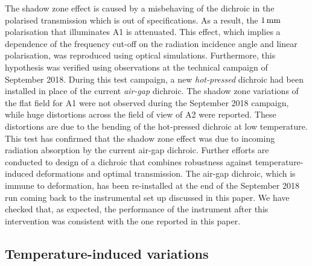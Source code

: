 The shadow zone effect is caused by {\lp a misbehaving of the dichroic in
the polarised transmission which is out of specifications. As a
result, the $1\,\rm{mm}$ polarisation that illuminates A1 is
attenuated.}
This effect,
which implies %
{\lp a dependence of the frequency cut-off on the radiation
incidence angle and linear polarisation,}
was reproduced using optical simulations. Furthermore, this hypothesis was
verified using observations at the technical campaign of September
2018. During this test campaign, a new \emph{hot-pressed} dichroic had
been installed in place of the current \emph{air-gap} dichroic.
%
%
The shadow zone variations of the flat field for A1 were
not observed during the September 2018 campaign, while huge distortions
across the field of view of A2 were reported. These distortions are
due to the bending of the hot-pressed dichroic at low temperature.
This test has confirmed that the shadow zone effect was due
to incoming radiation absorption by the current air-gap dichroic.
Further efforts are conducted to design of a dichroic that combines
robustness against temperature-induced deformations and optimal
transmission.
{\lp The air-gap dichroic, which is immune to deformation, has been
re-installed at the end of the September 2018 run coming back to the
instrumental set up discussed in this paper. We have checked that, as
expected, the performance of the instrument after this intervention
was consistent with the one reported in this paper.} 



\subsection{Temperature-induced variations}
\label{se:beam_variation}

